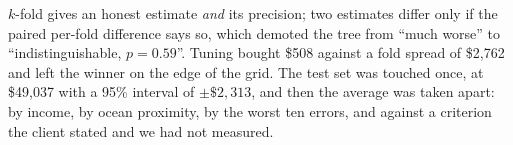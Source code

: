 \documentclass[11pt,a4paper]{article}
\begin{document}
$k$-fold gives an honest estimate \emph{and} its precision; two estimates
differ only if the paired per-fold difference says so, which demoted the tree
from ``much worse'' to ``indistinguishable, $p = 0.59$''. Tuning bought \$508
against a fold spread of \$2{,}762 and left the winner on the edge of the grid.
The test set was touched once, at \$49{,}037 with a 95\% interval of
$\pm\$2{,}313$, and then the average was taken apart: by income, by ocean
proximity, by the worst ten errors, and against a criterion the client stated
and we had not measured.
\end{document}
